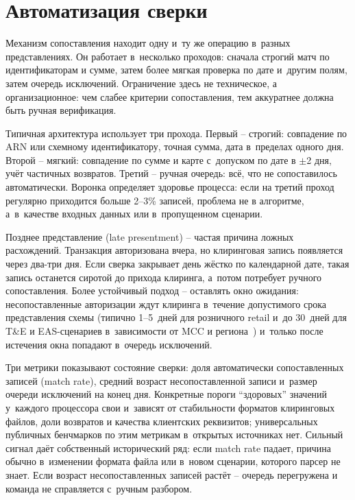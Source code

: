 \section{Автоматизация сверки}\label{sec:recon-automation}

Механизм сопоставления находит одну и~ту же
операцию в~разных представлениях. Он работает в~несколько проходов:
сначала строгий матч по идентификаторам и сумме, затем более мягкая
проверка по дате и~другим полям, затем очередь исключений. Ограничение
здесь не техническое, а организационное: чем слабее критерии
сопоставления, тем аккуратнее должна быть ручная верификация.

Типичная архитектура использует три прохода. Первый -- строгий:
совпадение по ARN или схемному идентификатору, точная сумма, дата
в~пределах одного дня. Второй -- мягкий: совпадение по сумме и
карте с~допуском по дате в $\pm$2 дня, учёт частичных возвратов.
Третий -- ручная очередь: всё, что не сопоставилось автоматически.
Воронка определяет здоровье процесса: если на третий проход
регулярно приходится больше 2--3\% записей, проблема не в
алгоритме, а~в~качестве входных данных или в~пропущенном сценарии.

Позднее представление (late presentment) -- частая причина ложных
расхождений. Транзакция авторизована вчера, но клиринговая запись
появляется через два-три дня. Если сверка закрывает день жёстко
по календарной дате, такая запись останется сиротой до прихода
клиринга, а~потом потребует ручного сопоставления. Более устойчивый
подход -- оставлять окно ожидания: несопоставленные авторизации
ждут клиринга в~течение допустимого срока представления схемы
(типично 1--5~дней для розничного retail и~до 30~дней для
T\&E и EAS-сценариев в~зависимости от MCC и
региона~\cite{visa-core-rules,mc-tpr}) и~только после истечения
окна попадают в~очередь исключений.

Три метрики показывают состояние сверки: доля автоматически
сопоставленных записей (match rate), средний возраст
несопоставленной записи и~размер очереди исключений на конец
дня. Конкретные пороги \enquote{здоровых} значений у~каждого
процессора свои и~зависят от стабильности форматов клиринговых
файлов, доли возвратов и качества клиентских реквизитов;
универсальных публичных бенчмарков по этим метрикам в~открытых
источниках нет. Сильный сигнал даёт собственный исторический
ряд: если match rate падает, причина обычно в~изменении формата
файла или в~новом сценарии, которого парсер не знает. Если
возраст несопоставленных записей растёт -- очередь перегружена
и команда не справляется с~ручным разбором.

